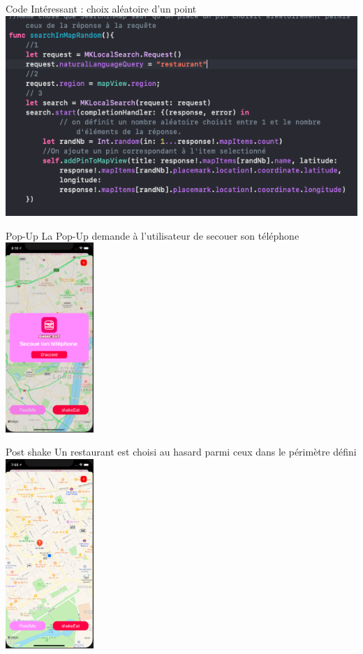     \begin{frame}{Code Intéressant : choix aléatoire d'un point}
        \centering
            \includegraphics[height = 0.6 \textheight]{images/code-aleatoire.png}
    \end{frame}
    
    
    \begin{frame}{Pop-Up}
        La Pop-Up demande à l'utilisateur de secouer son téléphone
        \centering
        \includegraphics[width = 0.25\textwidth]{images/carte-post-shake.png}
    \end{frame}
    
    \begin{frame}{Post shake}
        Un restaurant est choisi au hasard parmi ceux dans le périmètre défini 
        \centering
        \includegraphics[width = 0.25\textwidth]{images/Shaked.png}
    \end{frame}
    
    
    
    
    
    